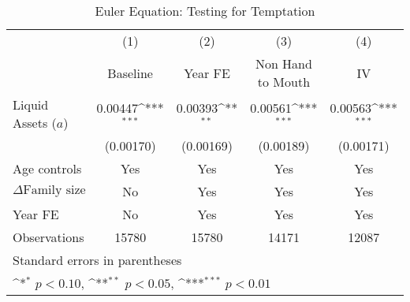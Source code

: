 {
\def\sym#1{\ifmmode^{#1}\else\(^{#1}\)\fi}
\begin{longtable}{l*{4}{c}}
\caption{Euler Equation: Testing for Temptation}\\
\toprule\endfirsthead\midrule\endhead\midrule\endfoot\endlastfoot
                    &\multicolumn{1}{c}{(1)}&\multicolumn{1}{c}{(2)}&\multicolumn{1}{c}{(3)}&\multicolumn{1}{c}{(4)}\\
                    &\multicolumn{1}{c}{Baseline}&\multicolumn{1}{c}{Year FE}&\multicolumn{1}{c}{Non Hand to Mouth}&\multicolumn{1}{c}{IV}\\
\midrule
Liquid Assets ($ a $) $\;\;\;\;\;\;\;\;\;\;\;\;$&     0.00447\sym{***}&     0.00393\sym{**} &     0.00561\sym{***}&     0.00563\sym{***}\\
                    &   (0.00170)         &   (0.00169)         &   (0.00189)         &   (0.00171)         \\
\addlinespace
Age controls        &         Yes         &         Yes         &         Yes         &         Yes         \\
\addlinespace
$\Delta\text{Family size}$ &          No         &         Yes         &         Yes         &         Yes         \\
\addlinespace
Year FE             &          No         &         Yes         &         Yes         &         Yes         \\
\midrule
Observations        &       15780         &       15780         &       14171         &       12087         \\
\bottomrule
\multicolumn{5}{l}{\footnotesize Standard errors in parentheses}\\
\multicolumn{5}{l}{\footnotesize \sym{*} \(p<0.10\), \sym{**} \(p<0.05\), \sym{***} \(p<0.01\)}\\
\end{longtable}
}

